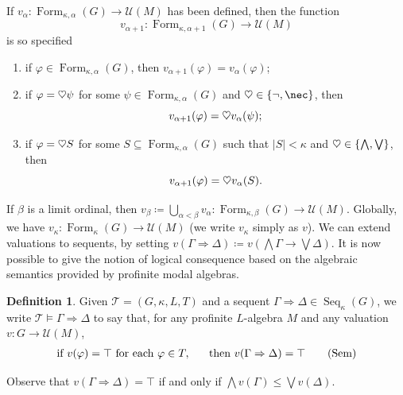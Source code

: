 \documentclass{article}
\theoremstyle{definition}
\newtheorem{defn}{Definition}
\DeclareMathOperator{\Formulas}{Form}
\DeclareMathOperator{\Seq}{Seq}
\newcommand{\heart}{\ensuremath\heartsuit}
\begin{document}
 If $v_\alpha \colon \Formulas_{\kappa,\alpha}(G) \longrightarrow \mathcal{U}(M)$ has been defined, then the function 
 $$v_{\alpha+1} \colon \Formulas_{\kappa,\alpha+1}(G) \longrightarrow \mathcal{U}(M)$$ is so specified
\begin{enumerate}
    \item if $\varphi \in \Formulas_{\kappa,\alpha}(G)$, then $v_{\alpha+1}(\varphi) = v_\alpha(\varphi)$;
    \item if $\varphi = \heart \psi$ for some $\psi \in \Formulas_{\kappa,\alpha}(G)$ and $\heart \in \{\neg, \nec\}$, then
    $$v_{\alpha+1}(\varphi) = \heart v_\alpha(\psi);$$
    \item if $\varphi = \heart S$ for some $S \subseteq \Formulas_{\kappa,\alpha}(G)$ such that $|S|<\kappa$ and $\heart \in \{\bigwedge, \bigvee\}$, then
    $$v_{\alpha+1}(\varphi) = \heart v_\alpha(S).$$
\end{enumerate}
If $\beta$ is a limit ordinal, then $v_\beta \coloneqq \bigcup_{\alpha<\beta} v_\alpha \colon \Formulas_{\kappa,\beta}(G) \longrightarrow \mathcal{U}(M)$. Globally, we have $v_\kappa \colon \Formulas_\kappa(G) \longrightarrow \mathcal{U}(M)$ (we  write $v_\kappa$ simply as $v$). We can extend valuations to sequents, by setting $v(\Gamma \Rightarrow \Delta) \coloneqq v(\bigwedge \Gamma \rightarrow \bigvee \Delta)$.
It is now possible to give the notion of logical consequence based on the algebraic semantics provided by profinite modal algebras.
\begin{defn}
Given $\mathcal{T} = (G,\kappa, L,T)$ and a sequent $\Gamma \Rightarrow \Delta \in \Seq_\kappa(G)$, we write $\mathcal{T} \vDash \Gamma \Rightarrow \Delta$ to say that, for any profinite $L$-algebra $M$ and any valuation $v \colon G \longrightarrow \mathcal{U}(M)$,
\begin{align}\label{eq:sem}
\text{if } v(\varphi) = \top \text{ for each } \varphi \in T, ~~~~~ \text{then } v(\Gamma \Rightarrow \Delta) = \top\tag{\text{Sem}}
\end{align}
\end{defn}
Observe that $v(\Gamma \Rightarrow \Delta) = \top$ if and only if $\bigwedge v(\Gamma) \leq \bigvee v(\Delta)$.
\end{document}
